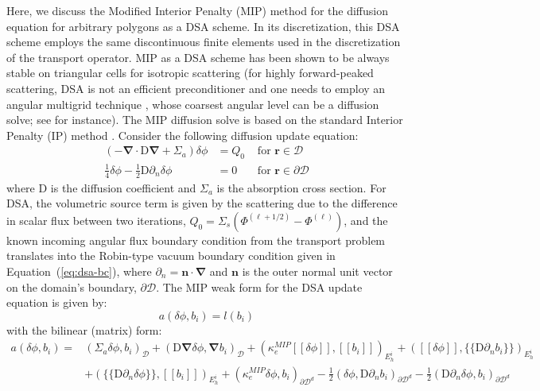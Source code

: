 \documentclass[preprint,10pt]{elsarticle}
\newcommand\grad{\boldsymbol{\nabla}}
\newcommand\br{\mathbf{r}}
\newcommand\bs{\boldsymbol}
\newcommand\mc{\mathcal}
\renewcommand{\(}{\left(}
\renewcommand{\)}{\right)}
\renewcommand{\[}{\left[}
\renewcommand{\]}{\right]}
\newcommand\vn{\bs{n}}
\newcommand{\jmp}[1]{[\![#1]\!]}                     %
\newcommand{\mvl}[1]{\{\!\!\{#1\}\!\!\}}             %
\begin{document}
Here, we discuss the Modified Interior Penalty (MIP) method for the diffusion equation for arbitrary polygons
as a DSA scheme. 
In its discretization, this DSA scheme employs the same discontinuous finite elements used in the 
discretization of the transport operator. 
MIP as a DSA scheme has been shown to be always stable on triangular cells for isotropic scattering \cite{mip}
(for highly forward-peaked scattering, DSA is not an efficient preconditioner and one needs to employ
an angular multigrid technique \cite{angular_multigrid_1d}, whose coarsest angular level can be a diffusion solve;
see \cite{angular_multigrid_bruno} for instance). 
The MIP diffusion solve is based on the standard Interior Penalty (IP) method
\cite{Kanschat2007}.
Consider the following diffusion update equation:
%
\begin{align}
  \label{eq:dsa}
  \left(-\grad \cdot \mathrm{D} \grad  + \Sigma_a \right) \delta \phi &= Q_0 &\textrm{ for }\br \in
  \mc{D}\\
  \label{eq:dsa-bc}
  \frac{1}{4}\delta \phi - \frac{1}{2} \mathrm{D} \partial_n \delta \phi & = 0 &\textrm{ for }
  \br \in \partial \mc{D} 
\end{align}
%
where $\mathrm{D}$ is the diffusion coefficient and $\Sigma_a$ is the absorption cross section. 
%
For DSA, the volumetric source term is given by the scattering due to the difference in scalar flux
between two iterations, $Q_0=\Sigma_s\(\Phi^{(\ell+1/2)}-\Phi^{(\ell)}\)$, 
%
and the known incoming angular flux boundary condition from the transport problem translates into the Robin-type
vacuum boundary condition given in Equation~\textup {(\ref {eq:dsa-bc})}, where $\partial_{n} = \vn\cdot \grad$
and $\vn$ is the outer normal unit vector on the domain's boundary, $\partial \mc{D}$. 
%
The MIP weak form for the DSA update equation is given by:
\begin{equation}
a(\delta \phi,b_i) = l(b_i)
\label{mip}
\end{equation}
%
with the bilinear (matrix) form:
\begin{equation}
\begin{split}
a(\delta \phi,b_i) =& \(\Sigma_a \delta \phi,b_i\)_{\mc{D}}
  + (\mathrm{D}\grad\delta \phi,\grad b_i)_{\mc{D}} 
	+ \( \kappa_e^{MIP} \jmp{\delta \phi}, \jmp{b_i}      \)_{E_h^i} 
	+ \( \jmp{\delta \phi}, \mvl{\mathrm{D}\partial_nb_i} \)_{E_h^i} \\	
& + \( \mvl{\mathrm{D}\partial_n \delta \phi},\jmp{b_i} \)_{E_h^i} 
  + \(\kappa_e^{MIP} \delta \phi,b_i\)_{\partial \mc{D}^d} 
	- \frac{1}{2} \(\delta \phi,\mathrm{D} \partial_nb_i\)_{\partial \mc{D}^d} 
	- \frac{1}{2} \(\mathrm{D} \partial_n\delta \phi,b_i\)_{\partial \mc{D}^d}
\label{mip_b}
\end{split}
\end{equation}
\end{document}
